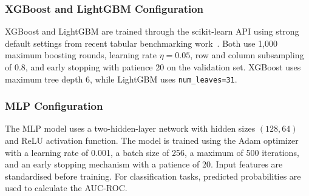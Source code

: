 \subsubsection{XGBoost and LightGBM Configuration}
\label{sec:gbdt-config}

XGBoost and LightGBM are trained through the scikit-learn API using strong default settings from recent tabular benchmarking work~\citep{chen2016xgboost,ke2017lightgbm,holzmuller2024better}. Both use 1{,}000 maximum boosting rounds, learning rate $\eta=0.05$, row and column subsampling of 0.8, and early stopping with patience 20 on the validation set. XGBoost uses maximum tree depth 6, while LightGBM uses \texttt{num\_leaves=31}.

\subsubsection{MLP Configuration}
\label{sec:mlp-config}

The MLP model uses a two-hidden-layer network with hidden sizes $(128,64)$ and ReLU activation function. The model is trained using the Adam optimizer with a learning rate of 0.001, a batch size of 256, a maximum of 500 iterations, and an early stopping mechanism with a patience of 20. Input features are standardised before training. For classification tasks, predicted probabilities are used to calculate the AUC-ROC.
